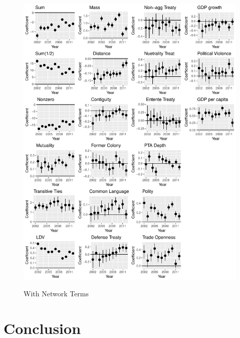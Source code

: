 \documentclass{article}
\begin{document}
\begin{figure}[h]
\centering
\includegraphics[scale=.75]{draft_figures/rl_plot_w.pdf}\\
  \caption{With Network Terms}
  \label{fig:1}
\end{figure}








\section{Conclusion}


\newpage


\end{document}
